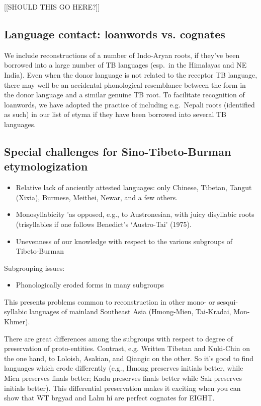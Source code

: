 [[SHOULD THIS GO HERE?]]

\subsection{Language contact: loanwords vs. cognates}

We include reconstructions of a number of Indo-Aryan roots, if they’ve been borrowed into a large number of TB languages (esp.\ in the Himalayas and NE India).
Even when the donor language is not related to the receptor TB language, there may well be an accidental phonological resemblance between the form in the donor language and a similar genuine TB root. To facilitate recognition of loanwords, we have adopted the practice of including e.g.\ Nepali roots (identified as such) in our list of etyma if they have been borrowed into several TB languages.

\subsection{Special challenges for Sino-Tibeto-Burman etymologization}

\begin{itemize}
\item Relative lack of anciently attested languages: only Chinese, Tibetan, Tangut (Xixia), Burmese, Meithei, Newar, and a few others.
\item Monosyllabicity	'as opposed, e.g., to Austronesian, with juicy disyllabic roots (trisyllables if one follows Benedict’s ‘Austro-Tai’ (1975).
\item Unevenness of our knowledge with respect to the various subgroups of Tibeto-Burman
\end{itemize}

Subgrouping issues: 

\begin{itemize}
\item Phonologically eroded forms in many subgroups 
\end{itemize}

This presents problems common to reconstruction in other mono- or sesqui-syllabic languages of mainland Southeast Asia (Hmong-Mien, Tai-Kradai, Mon-Khmer).
	
There are great differences among the subgroups with respect to degree of preservation of proto-entities. Contrast, e.g. Written Tibetan and Kuki-Chin on the one hand, to Loloish, Asakian, and Qiangic on the other. So it’s good to find languages which erode differently (e.g., Hmong preserves initials better, while Mien preserves finals better; Kadu preserves finals better while Sak preserves initials better). This differential preservation makes it exciting when you can show that WT brgyad and Lahu hí are perfect cognates for EIGHT.

